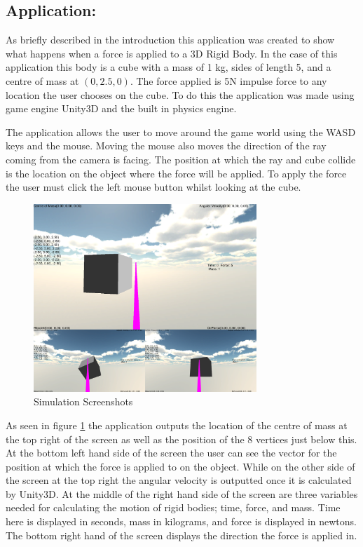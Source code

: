 \subsection{Application:}\label{sc:App}
As briefly described in the introduction this application was created to show what happens when a force is applied to a 3D Rigid Body.
In the case of this application this body is a cube with a mass of 1 kg, sides of length 5, and a centre of mass at $(0,2.5,0)$.
The force applied is 5N impulse force to any location the user chooses on the cube.
To do this the application was made using \citet{unity2013} game engine Unity3D and the built in physics engine.

The application allows the user to move around the game world using the WASD keys and the mouse.
Moving the mouse also moves the direction of the ray coming from the camera is facing.  
The position at which the ray and cube collide is the location on the object where the force will be applied.
To apply the force the user must click the left mouse button whilst looking at the cube.
\begin{figure}[h!tb]
	\centering
	\includegraphics[width=0.75\textwidth]{images/Simulation.PNG}
	\caption{Simulation Screenshots}
	\label{fig:Simulation}
\end{figure}

As seen in figure \ref{fig:Simulation} the application outputs the location of the centre of mass at the top right of the screen as well as the position of the 8 vertices just below this.
At the bottom left hand side of the screen the user can see the vector for the position at which the force is applied to on the object.
While on the other side of the screen at the top right the angular velocity is outputted once it is calculated by Unity3D.
At the middle of the right hand side of the screen are three variables needed for calculating the motion of rigid bodies; time, force, and mass.
Time here is displayed in seconds, mass in kilograms, and force is displayed in newtons.
The bottom right hand of the screen displays the direction the force is applied in.